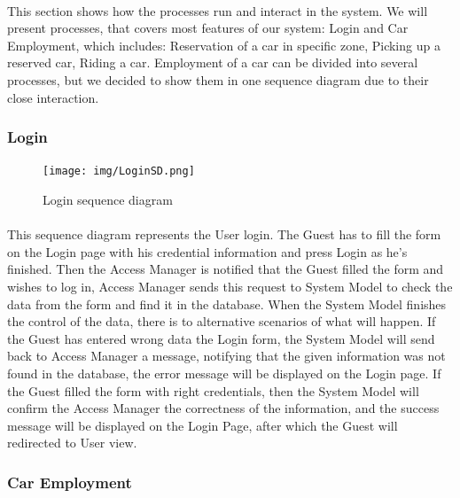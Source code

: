 	
		\paragraph{} This section shows how the processes run and interact in the system. 
		We will present processes, that covers most features of our system: Login and Car Employment, which includes: Reservation of a car in specific zone, Picking up a reserved car, Riding a car. Employment of a car can be divided into several processes, but we decided to show them in one sequence diagram due to their close interaction.    

	\subsubsection{Login}	
		\begin{figure}[h]
			\texttt{[image: img/LoginSD.png]}
			\caption{Login sequence diagram }
		\end{figure}
		
		\paragraph{} This sequence diagram represents the User login. 
		The Guest has to fill the form on the Login page with his credential information and press Login as he's finished. 
		Then the Access Manager is notified that the Guest filled the form and wishes to log in, Access Manager sends this request to System Model to check the data from the form and find it in the database. When the System Model finishes the control of the data, there is to alternative scenarios of what will happen. 
		If the Guest has entered wrong data the Login form, the System Model will send back to Access Manager a message, notifying that the given information was not found in the database, the error message will be displayed on the Login page. 
		If the Guest filled the form with right credentials, then the System Model will confirm the Access Manager the correctness of the information, and the success message will be displayed on the Login Page, after which the Guest will redirected to User view.           
			
	\newpage
	\subsubsection{Car Employment}	
	
